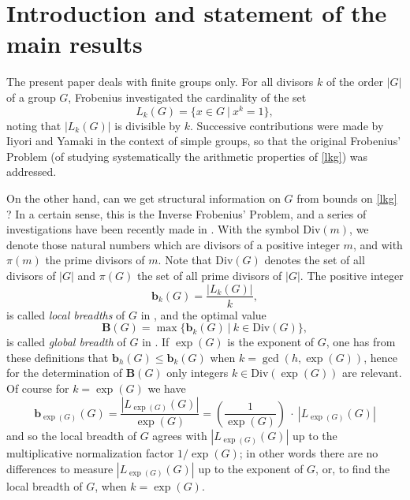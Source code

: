\documentclass{amsart}
\theoremstyle{definition}
\numberwithin{equation}{section}
\begin{document}
\maketitle












\section{Introduction and statement of the main results}



The present paper deals with finite groups only. For all divisors $k$ of the order $|G|$ of a group $G$, Frobenius \cite[Satz 1]{frobenius}  investigated   the cardinality  of the set \begin{equation}\label{lkg} L_k(G) = \{x \in G \ | \ x^k=1\},
\end{equation} noting that $|L_k(G)|$ is  divisible by $k$.  Successive contributions were made by Iiyori and Yamaki  \cite{yamaki1, yamaki2, yamaki3, yamaki4, yamaki5} in the context of simple groups, so that the original  Frobenius' Problem (of studying systematically the arithmetic properties of \eqref{lkg}) was addressed.

 
On the other hand, can we get structural information on $G$ from bounds on \eqref{lkg} ? In a certain sense, this is the Inverse Frobenius' Problem, and a series of investigations have been recently made  in \cite{ hr1, hr2, hr3, ms, meng2016, meng2017,  jm, russo}. With the symbol $\mathrm{Div}(m)$, we denote those natural numbers which are divisors of a positive integer $m$, and with $\pi(m)$ the  prime divisors of $m$. Note that $\mathrm{Div}(G)$  denotes the set of all divisors of $|G|$ and $\pi(G)$ the set of all prime divisors of $|G|$. The positive integer
\begin{equation}\label{lb}\mathbf{b}_k(G) = \frac{|L_k(G)|}{k}
,\end{equation}
is called \textit{local breadths} of $G$ in \cite{hr1, hr2, hr3}, and the  optimal value
\begin{equation}\label{gb} 
\mathbf{B}(G)=\max \{ \mathbf{b}_k(G) \ | \ k \in \mathrm{Div}(G) \},
\end{equation}
is called  \textit{global breadth}  of $G$  in \cite{hr1, hr2, hr3}. If $\exp(G)$ is the exponent of $G$,  one has from these definitions that $\mathbf{b}_h(G) \le \mathbf{b}_k(G)$ when $k=\gcd(h,\exp(G))$, hence for the determination of $\mathbf{B}(G)$ only integers $k \in \mathrm{Div}(\exp(G))$ are relevant. Of course for $k=\exp(G)$ we have  \begin{equation}
\mathbf{b}_{\exp(G)}(G)= \frac{|L_{\exp(G)}(G)|}{\exp(G)} = \left( \frac{1}{\exp(G)}\right)  \   \cdot \  |L_{\exp(G)}(G)|
\end{equation} and so the local breadth of $G$ agrees with   $|L_{\exp(G)}(G)|$  up to the multiplicative normalization factor  $1/\exp(G)$; in other words there are no differences to measure  $|L_{\exp(G)}(G)|$ up to the exponent of $G$, or, to find the local breadth of $G$, when $k=\exp(G)$.  
\end{document}

